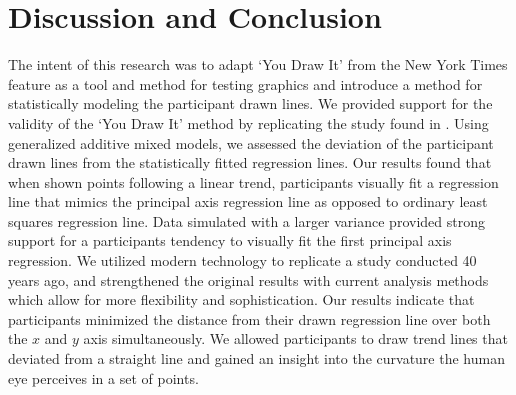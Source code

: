 \documentclass[12pt]{article}
\begin{document}
\hypertarget{conclusion-discussion}{%
\section{Discussion and Conclusion}\label{conclusion-discussion}}

The intent of this research was to adapt `You Draw It' from the New York
Times feature as a tool and method for testing graphics and introduce a
method for statistically modeling the participant drawn lines. We
provided support for the validity of the `You Draw It' method by
replicating the study found in \citet{mosteller1981eye}. Using
generalized additive mixed models, we assessed the deviation of the
participant drawn lines from the statistically fitted regression lines.
Our results found that when shown points following a linear trend,
participants visually fit a regression line that mimics the principal
axis regression line as opposed to ordinary least squares regression
line. Data simulated with a larger variance provided strong support for
a participants tendency to visually fit the first principal axis
regression. We utilized modern technology to replicate a study conducted
40 years ago, and strengthened the original results with current
analysis methods which allow for more flexibility and sophistication.
Our results indicate that participants minimized the distance from their
drawn regression line over both the \(x\) and \(y\) axis simultaneously.
We allowed participants to draw trend lines that deviated from a
straight line and gained an insight into the curvature the human eye
perceives in a set of points.
\end{document}
